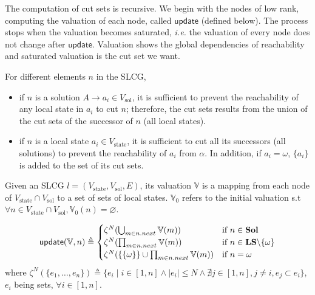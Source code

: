The computation of cut sets is recursive.
We begin with the nodes of low rank, computing the valuation of each node, called $\mathsf{update}$ (defined below).
The process stops when the valuation becomes saturated, \textit{i.e.} the valuation of every node does not change after $\mathsf{update}$.
Valuation shows the global dependencies of reachability and saturated valuation is the cut set we want.

For different elements $n$ in the SLCG,  

\begin{itemize}
\item if $n$ is a solution $A\to a_i \in V_{\mathrm{sol}}$, it is sufficient to prevent the reachability of any local state in $a_i$ to cut $n$; therefore, the cut sets results from the union
of the cut sets of the successor of $n$ (all local states).
\item if $n$ is a local state $a_i\in V_{\mathrm{state}}$, it is sufficient to cut all its successors (all solutions) to prevent the reachability of $a_i$ from $\alpha$. 
In addition, if $a_i=\omega$, $\{a_i\}$ is added to the set of its cut sets.
\end{itemize}

\begin{definition}[Valuation]\label{def:valuation}
Given an SLCG $l= (V_{\mathrm{state}},V_{\mathrm{sol}},E)$, its valuation $\mathbb{V}$ is a mapping from each node of $V_{\mathrm{state}}\cap V_{\mathrm{sol}}$ to a set of sets of local states.
$\mathbb{V}_0$ refers to the initial valuation s.t $\forall n \in V_{\mathrm{state}}\cap V_{\mathrm{sol}}, \mathbb{V}_0(n)=\varnothing$.
\end{definition}


\begin{definition}
\begin{equation}  
\mathsf{update}(\mathbb{V},n)\triangleq 
      \begin{cases}
            \zeta^N(\bigcup_{m\in n.next}\mathbb{V}(m))&\text{if } n\in\mathbf{Sol}\\
            \zeta^N(\prod_{m\in n.next}\mathbb{V}(m))&\text{if } n\in\mathbf{LS}\miset{\omega}\\
            \zeta^N(\{\{\omega\}\}\cup\prod_{m\in n.next}\mathbb{V}(m))&\text{if }n=\omega\\
      \end{cases}
\end{equation}
where $\zeta^N(\{e_1,\ldots,e_n\})\triangleq\{e_i\mid i\in[1,n]\land |e_i|\leq N\land\nexists j\in[1,n],j\neq i,e_j\subset e_i\}$, $e_i$ being sets, $\forall i\in[1,n]$.
\end{definition}

